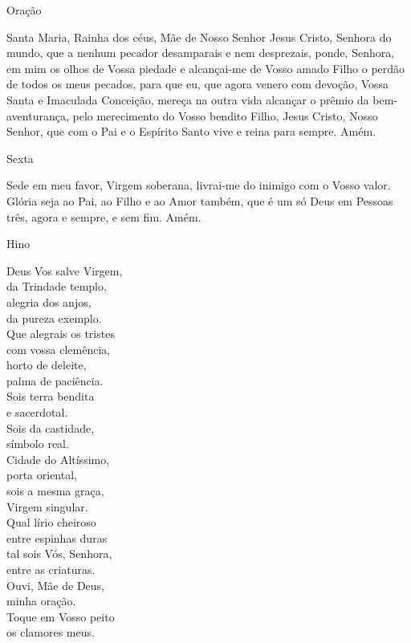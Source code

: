 \documentclass{book}
\begin{document}
\begin{center}
    \textcolor{VioletRed2}{Oração}
\end{center}
\begin{flushleft}
    Santa Maria, Rainha dos céus, Mãe de Nosso Senhor Jesus Cristo, Senhora do mundo, que a nenhum pecador desamparais e nem desprezais, ponde, Senhora, em mim os olhos de Vossa piedade e alcançai-me de Vosso amado Filho o perdão de todos os meus pecados, para que eu, que agora venero com devoção, Vossa Santa e Imaculada Conceição, mereça na outra vida alcançar o prêmio da bem-aventurança, pelo merecimento do Vosso bendito Filho, Jesus Cristo, Nosso Senhor, que com o Pai e o Espírito Santo vive e reina para sempre. Amém.
\end{flushleft}
\newpage
\begin{center}
    Sexta
\end{center}
\begin{flushleft}
    Sede em meu favor, Virgem soberana, livrai-me do inimigo com o Vosso valor. Glória seja ao Pai, ao Filho e ao Amor também, que é um só Deus em Pessoas três, agora e sempre, e sem fim. Amém.
\end{flushleft}
\begin{center}
    \textcolor{VioletRed2}{Hino}
\end{center}
\begin{multicols}{2}
    Deus Vos salve Virgem, \\
    da Trindade templo, \\
    alegria dos anjos, \\
    da pureza exemplo.
    \vspace{.2cm} \\
    Que alegrais os tristes \\
    com vossa clemência, \\
    horto de deleite, \\
    palma de paciência.
    \vspace{.2cm} \\
    Sois terra bendita \\
    e sacerdotal. \\
    Sois da castidade, \\
    símbolo real.
    \vspace{.2cm} \\
    Cidade do Altíssimo, \\
    porta oriental, \\
    sois a mesma graça, \\
    Virgem singular.
    \vspace{.2cm} \\
    Qual lírio cheiroso \\
    entre espinhas duras \\
    tal sois Vós, Senhora, \\
    entre as criaturas.
    \vspace{.2cm} \\
    Ouvi, Mãe de Deus, \\
    minha oração. \\
    Toque em Vosso peito \\
    os clamores meus.
\end{multicols}
\end{document}
